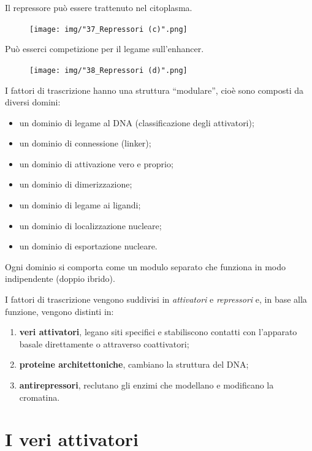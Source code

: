 \documentclass[11pt]{book}
\begin{document}
Il repressore può essere trattenuto nel citoplasma.

\begin{figure}[htp]
\centering
\texttt{[image: img/"37\_Repressori (c)".png]}
\caption{}
\label{repressori-c}
\end{figure}

Può esserci competizione per il legame sull'enhancer.

\begin{figure}[htp]
\centering
\texttt{[image: img/"38\_Repressori (d)".png]}
\caption{}
\label{repressori-d}
\end{figure}

I fattori di trascrizione hanno una struttura ``modulare'', cioè sono
composti da diversi domini:

\begin{itemize}
\itemsep1pt\parskip0pt
\item
  un dominio di legame al DNA (classificazione degli attivatori);
\item
  un dominio di connessione (linker);
\item
  un dominio di attivazione vero e proprio;
\item
  un dominio di dimerizzazione;
\item
  un dominio di legame ai ligandi;
\item
  un dominio di localizzazione nucleare;
\item
  un dominio di esportazione nucleare.
\end{itemize}

Ogni dominio si comporta come un modulo separato che funziona in modo
indipendente (doppio ibrido).

I fattori di trascrizione vengono suddivisi in \emph{attivatori} e
\emph{repressori} e, in base alla funzione, vengono distinti in:

\begin{enumerate}
\def\labelenumi{\arabic{enumi}.}
\itemsep1pt\parskip0pt
\item
  \textbf{veri attivatori}, legano siti specifici e stabiliscono
  contatti con l'apparato basale direttamente o attraverso coattivatori;
\item
  \textbf{proteine architettoniche}, cambiano la struttura del DNA;
\item
  \textbf{antirepressori}, reclutano gli enzimi che modellano e
  modificano la cromatina.
\end{enumerate}

\section{I veri attivatori}\label{i-veri-attivatori}
\end{document}
